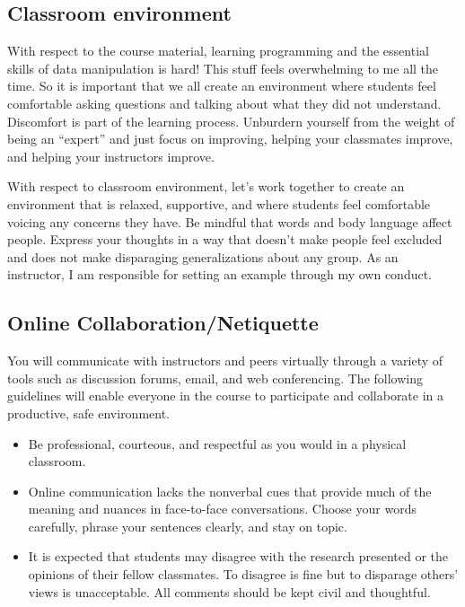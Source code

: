 \documentclass[11pt,]{article}
\providecommand{\tightlist}{%
  \setlength{\itemsep}{0pt}\setlength{\parskip}{0pt}}
\begin{document}
\hypertarget{classroom-environment}{%
\subsection{Classroom environment}\label{classroom-environment}}

With respect to the course material, learning programming and the
essential skills of data manipulation is hard! This stuff feels
overwhelming to me all the time. So it is important that we all create
an environment where students feel comfortable asking questions and
talking about what they did not understand. Discomfort is part of the
learning process. Unburdern yourself from the weight of being an
``expert'' and just focus on improving, helping your classmates improve,
and helping your instructors improve.

With respect to classroom environment, let's work together to create an
environment that is relaxed, supportive, and where students feel
comfortable voicing any concerns they have. Be mindful that words and
body language affect people. Express your thoughts in a way that doesn't
make people feel excluded and does not make disparaging generalizations
about any group. As an instructor, I am responsible for setting an
example through my own conduct.

\hypertarget{online-collaborationnetiquette}{%
\subsection{Online
Collaboration/Netiquette}\label{online-collaborationnetiquette}}

You will communicate with instructors and peers virtually through a
variety of tools such as discussion forums, email, and web conferencing.
The following guidelines will enable everyone in the course to
participate and collaborate in a productive, safe environment.

\begin{itemize}
\tightlist
\item
  Be professional, courteous, and respectful as you would in a physical
  classroom.
\item
  Online communication lacks the nonverbal cues that provide much of the
  meaning and nuances in face-to-face conversations. Choose your words
  carefully, phrase your sentences clearly, and stay on topic.
\item
  It is expected that students may disagree with the research presented
  or the opinions of their fellow classmates. To disagree is fine but to
  disparage others' views is unacceptable. All comments should be kept
  civil and thoughtful.
\end{itemize}
\end{document}
